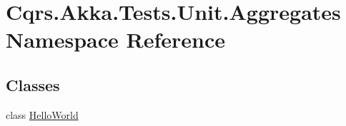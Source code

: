 \hypertarget{namespaceCqrs_1_1Akka_1_1Tests_1_1Unit_1_1Aggregates}{}\section{Cqrs.\+Akka.\+Tests.\+Unit.\+Aggregates Namespace Reference}
\label{namespaceCqrs_1_1Akka_1_1Tests_1_1Unit_1_1Aggregates}
\subsection*{Classes}
\begin{DoxyCompactItemize}
\item 
class \hyperlink{classCqrs_1_1Akka_1_1Tests_1_1Unit_1_1Aggregates_1_1HelloWorld}{Hello\+World}
\end{DoxyCompactItemize}
